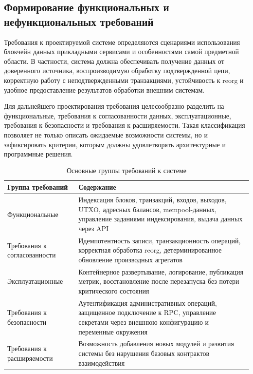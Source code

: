 ﻿\subsection{Формирование функциональных и нефункциональных требований}

Требования к проектируемой системе определяются сценариями использования
блокчейн данных прикладными сервисами и особенностями самой предметной области.
В частности, система должна обеспечивать получение данных от доверенного
источника, воспроизводимую обработку подтвержденной цепи, корректную работу с
неподтвержденными транзакциями, устойчивость к reorg и удобное предоставление
результатов обработки внешним системам.

Для дальнейшего проектирования требования целесообразно разделить на
функциональные, требования к согласованности данных, эксплуатационные,
требования к безопасности и требования к расширяемости. Такая классификация
позволяет не только описать ожидаемые возможности системы, но и зафиксировать
критерии, которым должны удовлетворять архитектурные и программные решения.

\begin{table}
    \caption{Основные группы требований к системе}
    \begin{tabular}{|p{}|p{}|}\hline
    Группа требований & Содержание \\ \hline
    Функциональные & Индексация блоков, транзакций, входов, выходов, UTXO, адресных балансов, mempool-данных, управление заданиями индексирования, выдача данных через API \\ \hline
    Требования к согласованности & Идемпотентность записи, транзакционность операций, корректная обработка reorg, детерминированное обновление производных агрегатов \\ \hline
    Эксплуатационные & Контейнерное развертывание, логирование, публикация метрик, восстановление после перезапуска без потери критического состояния \\ \hline
    Требования к безопасности & Аутентификация административных операций, защищенное подключение к RPC, управление секретами через внешнюю конфигурацию и переменные окружения \\ \hline
    Требования к расширяемости & Возможность добавления новых модулей и развития системы без нарушения базовых контрактов взаимодействия \\ \hline
    \end{tabular}
    \label{tab:requirements-groups}
\end{table}

